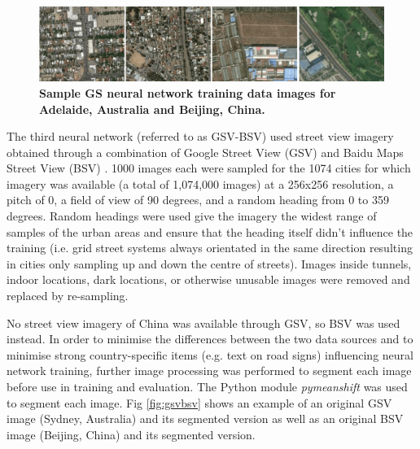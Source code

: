 \documentclass[Crown,sageh,times]{sagej}
\begin{document}
\begin{figure}[!htbp]
\centering 
\includegraphics[scale=1]{Images/PlosOne/Fig3.png}     
\caption{\bf Sample GS neural network training data images for Adelaide, Australia and Beijing, China. \cite{GoogleStatic2017}}    
 \label{fig:satbeiade}  
\end{figure} 

The third neural network (referred to as GSV-BSV) used street view imagery obtained through a combination of Google Street View (GSV) \cite{GoogleMaps2017b} and Baidu Maps Street View (BSV) \cite{Baidu2017}. 1000 images each were sampled for the 1074 cities for which imagery was available (a total of 1,074,000 images) at a 256x256 resolution, a pitch of 0, a field of view of 90 degrees, and a random heading from 0 to 359 degrees. Random headings were used give the imagery the widest range of samples of the urban areas and ensure that the heading itself didn't influence the training (i.e. grid street systems always orientated in the same direction resulting in cities only sampling up and down the centre of streets). Images inside tunnels, indoor locations, dark locations, or otherwise unusable images were removed and replaced by re-sampling.

No street view imagery of China was available through GSV, so BSV was used instead.  In order to minimise the differences between the two data sources and to minimise strong country-specific items (e.g. text on road signs) influencing neural network training, further image processing was performed to segment each image before use in training and evaluation. The Python module \textit{pymeanshift} \cite{Pymeanshift2017} was used to segment each image. Fig \ref{fig:gsvbsv} shows an example of an original GSV image (Sydney, Australia) and its segmented version as well as an original BSV image (Beijing, China) and its segmented version.

\end{document}
